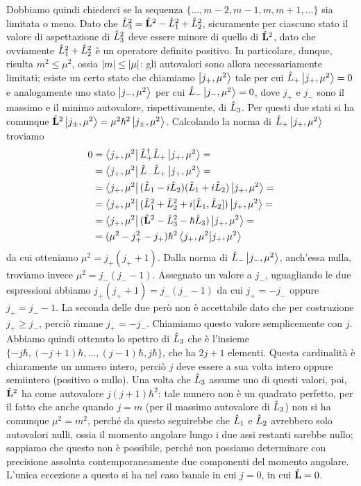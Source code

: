 Dobbiamo quindi chiederci se la sequenza $\{\dots,m-2,m-1,m,m+1,\dots\}$ sia limitata o meno.
Dato che $\hat{L}_3^2=\hat{\mathbf{L}}^2-\hat{L}_1^2+\hat{L}_2^2$, sicuramente per ciascuno stato il valore di aspettazione di $\hat{L}_3^2$ deve essere minore di quello di $\hat{\mathbf{L}}^2$, dato che ovviamente $\hat{L}_1^2+\hat{L}_2^2$ è un operatore definito positivo.
In particolare, dunque, risulta $m^2\le\mu^2$, ossia $\left|{m}\right|\le\left|{\mu}\right|$: gli autovalori sono allora necessariamente limitati; esiste un certo stato che chiamiamo $\left|{j_+,\mu^2}\right\rangle$ tale per cui $\hat{L}_+\left|{j_+,\mu^2}\right\rangle=0$ e analogamente uno stato $\left|{j_-,\mu^2}\right\rangle$ per cui $\hat{L}_-\left|{j_-,\mu^2}\right\rangle=0$, dove $j_+$ e $j_-$ sono il massimo e il minimo autovalore, rispettivamente, di $\hat{L}_3$.
Per questi due stati si ha comunque $\hat{\mathbf{L}}^2\left|{j_\pm,\mu^2}\right\rangle=\mu^2\hbar^2\left|{j_\pm,\mu^2}\right\rangle$.
Calcolando la norma di $\hat{L}_+\left|{j_+,\mu^2}\right\rangle$ troviamo
\begin{equation}
	\begin{split}
		0&=\left\langle{j_+,\mu^2}\right|{\hat{L}_+}^\dagger\hat{L}_+\left|{j_+,\mu^2}\right\rangle=\\
		&=\left\langle{j_+,\mu^2}\right|\hat{L}_-\hat{L}_+\left|{j_+,\mu^2}\right\rangle=\\
		&=\left\langle{j_+,\mu^2}\right|(\hat{L}_1-i\hat{L}_2)(\hat{L}_1+i\hat{L}_2)\left|{j_+,\mu^2}\right\rangle=\\
		&=\left\langle{j_+,\mu^2}\right|(\hat{L}_1^2+\hat{L}_2^2+i[\hat{L}_1,\hat{L}_2])\left|{j_+,\mu^2}\right\rangle=\\
		&=\left\langle{j_+,\mu^2}\right|(\hat{\mathbf{L}}^2-\hat{L}_3^2-\hbar\hat{L}_3)\left|{j_+,\mu^2}\right\rangle=\\
		&=(\mu^2-j_+^2-j_+)\hbar^2\left\langle{j_+,\mu^2}\middle|{j_+,\mu^2}\right\rangle
	\end{split}
\end{equation}
da cui otteniamo $\mu^2=j_+(j_++1)$.
Dalla norma di $\hat{L}_-\left|{j_-,\mu^2}\right\rangle$, anch'essa nulla, troviamo invece $\mu^2=j_-(j_--1)$.
Assegnato un valore a $j_-$, uguagliando le due espressioni abbiamo $j_+(j_++1)=j_-(j_--1)$ da cui $j_+=-j_-$ oppure $j_+=j_--1$.
La seconda delle due però non è accettabile dato che per costruzione $j_+\ge j_-$, perciò rimane $j_+=-j_-$.
Chiamiamo questo valore semplicemente con $j$.
Abbiamo quindi ottenuto lo spettro di $\hat{L}_3$ che è l'insieme $\{-j\hbar,(-j+1)\hbar,\dots,(j-1)\hbar,j\hbar\}$, che ha $2j+1$ elementi.
Questa cardinalità è chiaramente un numero intero, perciò $j$ deve essere a sua volta intero oppure semiintero (positivo o nullo).
Una volta che $\hat{L}_3$ assume uno di questi valori, poi, $\hat{\mathbf{L}}^2$ ha come autovalore $j(j+1)\hbar^2$: tale numero non è un quadrato perfetto, per il fatto che anche quando $j=m$ (per il massimo autovalore di $\hat{L}_3$) non si ha comunque $\mu^2=m^2$, perch\'e da questo seguirebbe che $\hat{L}_1$ e $\hat{L}_2$ avrebbero solo autovalori nulli, ossia il momento angolare lungo i due assi restanti sarebbe nullo; sappiamo che questo non è possibile, perch\'e non possiamo determinare con precisione assoluta contemporaneamente due componenti del momento angolare.
L'unica eccezione a questo si ha nel caso banale in cui $j=0$, in cui $\hat{\mathbf{L}}=0$.

